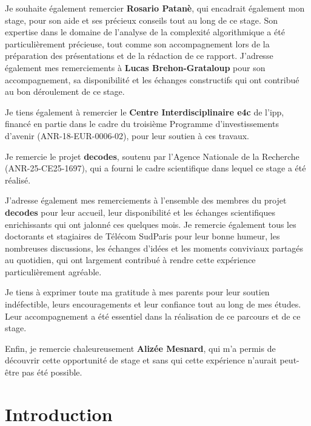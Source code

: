 \documentclass[12pt, a4paper]{report}
\begin{document}
	Je souhaite également remercier \textbf{Rosario Patanè}, qui encadrait également mon stage, pour son aide et ses précieux conseils tout au long de ce stage. Son expertise dans le domaine de l'analyse de la complexité algorithmique a été particulièrement précieuse, tout comme son accompagnement lors de la préparation des présentations et de la rédaction de ce rapport. J'adresse également mes remerciements à \textbf{Lucas Brehon-Grataloup} pour son accompagnement, sa disponibilité et les échanges constructifs qui ont contribué au bon déroulement de ce stage.

	Je tiens également à remercier le \textbf{Centre Interdisciplinaire \gls{e4c}} de l'\gls{ipp}, financé en partie dans le cadre du troisième Programme d'investissements d'avenir (ANR-18-EUR-0006-02), pour leur soutien à ces travaux.

	Je remercie le projet \textbf{\gls{decodes}}, soutenu par l'Agence Nationale de la Recherche (ANR-25-CE25-1697), qui a fourni le cadre scientifique dans lequel ce stage a été réalisé.

	J'adresse également mes remerciements à l'ensemble des membres du projet \textbf{\gls{decodes}} pour leur accueil, leur disponibilité et les échanges scientifiques enrichissants qui ont jalonné ces quelques mois. Je remercie également tous les doctorants et stagiaires de Télécom SudParis pour leur bonne humeur, les nombreuses discussions, les échanges d'idées et les moments conviviaux partagés au quotidien, qui ont largement contribué à rendre cette expérience particulièrement agréable.

	Je tiens à exprimer toute ma gratitude à mes parents pour leur soutien indéfectible, leurs encouragements et leur confiance tout au long de mes études. Leur accompagnement a été essentiel dans la réalisation de ce parcours et de ce stage.

	Enfin, je remercie chaleureusement \textbf{Alizée Mesnard}, qui m'a permis de découvrir cette opportunité de stage et sans qui cette expérience n'aurait peut-être pas été possible.


	\tableofcontents

	\listoffigures
	\newpage

	\printglossary[type=\acronymtype,nonumberlist]


	\chapter*{Introduction}
\end{document}
